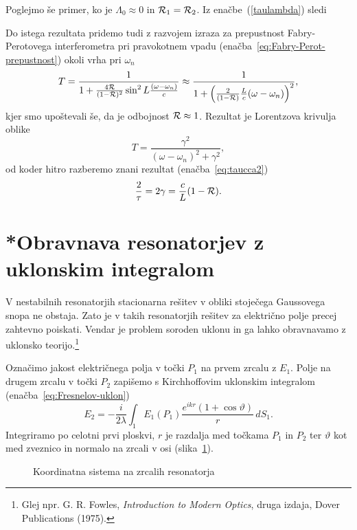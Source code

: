 Poglejmo še primer, ko je $\Lambda_0 \approx 0$ in ${\cal R}_1 = {\cal R}_2$.
Iz enačbe~(\ref{taulambda}) sledi

Do istega rezultata pridemo tudi z razvojem izraza za prepustnost Fabry-Perotovega 
interferometra pri pravokotnem vpadu (enačba~\ref{eq:Fabry-Perot-prepustnost}) okoli vrha pri $\omega_{n}$
\begin{equation}
T=\frac{1}{1+\frac{4{\cal R}}{(1-{\cal R})^{2}}\sin^{2}L\frac{(\omega-\omega_{n})}{c}}\approx 
\frac{1}{1+\left(\frac{2}{(1-{\cal R})}\frac{L}{c}(\omega-\omega_{n})\right)^{2}},
\label{3.27}
\end{equation}
 kjer smo upoštevali še, da je odbojnost ${\cal R} \approx 1$. Rezultat je Lorentzova
 krivulja oblike
 \begin{equation}
 T = \frac{\gamma^2}{(\omega - \omega_n)^2+\gamma^2},
 \label{eq:FBi2}
 \end{equation}
od koder hitro razberemo znani rezultat (enačba~\ref{eq:taucca2})
\begin{equation}
\frac{2}{\tau}=2\gamma = \frac{c}{L}(1-{\cal R}).
\end{equation}

\section{*Obravnava resonatorjev z uklonskim integralom}
\label{Resonator_uklon}

V nestabilnih resonatorjih stacionarna rešitev v obliki stoječega
Gaussovega snopa ne obstaja. Zato je v takih resonatorjih rešitev za električno polje precej
zahtevno poiskati. Vendar je problem soroden uklonu in ga lahko obravnavamo z 
uklonsko teorijo.\footnote{Glej npr. G. R. Fowles, {\it 
Introduction to Modern Optics}, druga izdaja, Dover Publications (1975).}

Označimo jakost električnega polja v točki $P_{1}$ na prvem zrcalu z $E_{1}$.
Polje na drugem zrcalu v točki $P_2$ zapišemo s Kirchhoffovim uklonskim
integralom (enačba~\ref{eq:Fresnelov-uklon})
\begin{equation}
E_{2} =  -\frac{i}{2\lambda}\int_{1}E_{1}(P_{1})\frac{e^{ikr}(1+\cos\vartheta)}{r}\, dS_{1}.
\label{eq:resuklon}
\end{equation}
Integriramo po celotni prvi ploskvi, $r$ je razdalja med točkama $P_{1}$ in $P_{2}$ ter $\vartheta$
kot med zveznico in normalo na zrcali v osi (slika~\ref{fig:uklon_res_shema}). 
\begin{figure}[ht]
\centering
\def\svgwidth{90truemm} 

\caption{Koordinatna sistema na zrcalih resonatorja}
\label{fig:uklon_res_shema}
\end{figure}

